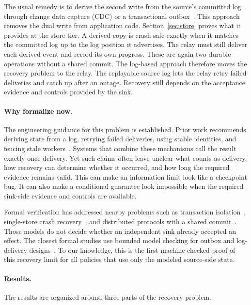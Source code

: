 \documentclass[sigplan,10pt]{acmart}
\theoremstyle{plain}
\theoremstyle{definition}
\begin{document}
The usual remedy is to derive the second write from the source's
committed log through change data capture (CDC) or a transactional
outbox~\cite{kleppmann2015dualwrites,ddia,kleppmann2019olep}. This
approach removes the dual write from application code.
Section~\ref{sec:store} proves what it provides at the store tier. A
derived copy is crash-safe exactly when it matches the committed log
up to the log position it advertises. The relay must still deliver
each derived event and record its own progress. These are again two
durable operations without a shared commit. The log-based approach 
therefore moves the recovery problem to the relay. The replayable source
log lets the relay retry failed deliveries and catch up after an outage.
Recovery still depends on the acceptance evidence and controls provided
by the sink.

\paragraph{Why formalize now.}
The engineering guidance for this problem is established. Prior work
recommends deriving state from a log, retrying failed deliveries, using
stable identities, and fencing stale
workers~\cite{kleppmann2015dualwrites,ddia,treat,kleppmann2019olep}.
Systems that combine these mechanisms call the result exactly-once
delivery. Yet such claims often leave unclear what counts as delivery,
how recovery can determine whether it occurred, and how long the required
evidence remains valid.
This can make an information limit look like a checkpoint bug. It
can also make a conditional guarantee look impossible when the
required sink-side evidence and controls are available.

Formal verification has addressed nearby problems such as transaction
isolation~\cite{veriso}, single-store crash
recovery~\cite{gojournal,perennial}, and distributed protocols with a
shared commit~\cite{disel}. Those models do not decide whether an
independent sink already accepted an effect. The closest formal
studies use bounded model checking for outbox and log-delivery
designs~\cite{masternak,logplayer}. To our knowledge, this is the first machine-checked proof of this
recovery limit for all policies that use only the modeled source-side
state.

\paragraph{Results.}
The results are organized around three parts of the recovery problem.
\end{document}
